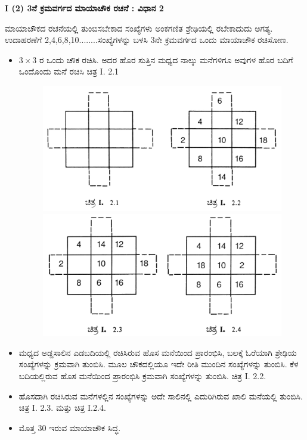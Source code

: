 \noindent \textbf{I (2) 3ನೆ ಕ್ರಮವರ್ಗದ ಮಾಯಾಚೌಕ ರಚನೆ : ವಿಧಾನ 2}

ಮಾಯಾಚೌಕದ ರಚನೆಯಲ್ಲಿ ತುಂಬಿಸಬೇಕಾದ ಸಂಖ್ಯೆಗಳು ಅಂಕಗಣಿತ ಶ್ರೇಢಿಯಲ್ಲಿ ರಬೇಕಾದುದು ಅಗತ್ಯ. ಉದಾಹರಣೆಗೆ 2,4,6,8,10........ಸಂಖ್ಯೆಗಳನ್ನು ಬಳಸಿ 3ನೇ ಕ್ರಮವರ್ಗದ ಒಂದು ಮಾಯಾಚೌಕ ರಚಿಸೋಣ.

\begin{itemize}
	\item $3 \times 3$ ರ ಒಂದು ಚೌಕ ರಚಿಸಿ. ಅದರ ಹೊರ ಸುತ್ತಿನ ಮಧ್ಯದ ನಾಲ್ಕು ಮನೆಗಳಿಗೂ ಅವುಗಳ ಹೊರ ಬದಿಗೆ ಒಂದೊಂದು ಮನೆ ರಚಿಸಿ ಚಿತ್ರ I. 2.1
	\begin{figure}[H]
	\includegraphics{src/figures/chap3/fig3-3.jpg}\\
	\includegraphics{src/figures/chap3/fig3-4.jpg}
	\end{figure}
	\item ಮಧ್ಯದ ಅಡ್ಡಸಾಲಿನ ಎಡಬದಿಯಲ್ಲಿ ರಚಿಸಿರುವ ಹೊಸ ಮನೆಯಿಂದ ಪ್ರಾರಂಭಿಸಿ, ಬಲಕ್ಕೆ ಓರೆಯಾಗಿ ಶ್ರೇಢಿಯ ಸಂಖ್ಯೆಗಳನ್ನು ಕ್ರಮವಾಗಿ ತುಂಬಿಸಿ. ಮೂಲ ಚೌಕದಲ್ಲಿಯೂ ಇದೇ ರೀತಿ ಮುಂದಿನ ಸಂಖ್ಯೆಗಳನ್ನು ತುಂಬಿಸಿ. ಕೆಳ ಬದಿಯಲ್ಲಿರುವ ಹೊಸ ಮನೆಯಿಂದ ಪ್ರಾರಂಭಿಸಿ ಕ್ರಮವಾಗಿ ಸಂಖ್ಯೆಗಳನ್ನು ತುಂಬಿಸಿ. ಚಿತ್ರ I. 2.2.
	\item ಹೊಸದಾಗಿ ರಚಿಸಿರುವ ಮನೆಗಳಲ್ಲಿನ ಸಂಖ್ಯೆಗಳನ್ನು ಅದೇ ಸಾಲಿನಲ್ಲಿ ಎದುರಿಗಿರುವ ಖಾಲಿ ಮನೆಯಲ್ಲಿ ತುಂಬಿಸಿ. ಚಿತ್ರ I. 2.3. ಮತ್ತು ಚಿತ್ರ I.2.4.
	\item ಮೊತ್ತ 30 ಇರುವ ಮಾಯಾಚೌಕ ಸಿದ್ಧ.
\end{itemize}

